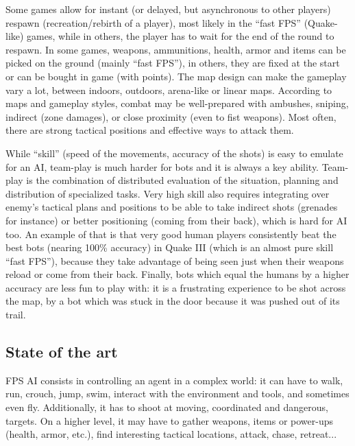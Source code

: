 Some games allow for instant (or delayed, but asynchronous to other players) respawn (recreation/rebirth of a player), most likely in the ``fast FPS'' (Quake-like) games, while in others, the player has to wait for the end of the round to respawn. In some games, weapons, ammunitions, health, armor and items can be picked on the ground (mainly ``fast FPS''), in others, they are fixed at the start or can be bought in game (with points). The map design can make the gameplay vary a lot, between indoors, outdoors, arena-like or linear maps. According to maps and gameplay styles, combat may be well-prepared with ambushes, sniping, indirect (zone damages), or close proximity (even to fist weapons). Most often, there are strong tactical positions and effective ways to attack them. 

While ``skill'' (speed of the movements, accuracy of the shots) is easy to emulate for an AI, team-play is much harder for bots and it is always a key ability. Team-play is the combination of distributed evaluation of the situation, planning and distribution of specialized tasks. Very high skill also requires integrating over enemy's tactical plans and positions to be able to take indirect shots (grenades for instance) or better positioning (coming from their back), which is hard for AI too. An example of that is that very good human players consistently beat the best bots (nearing 100\% accuracy) in Quake III (which is an almost pure skill ``fast FPS''), because they take advantage of being seen just when their weapons reload or come from their back. Finally, bots which equal the humans by a higher accuracy are less fun to play with: it is a frustrating experience to be shot across the map, by a bot which was stuck in the door because it was pushed out of its trail.

\subsection{State of the art}

FPS AI consists in controlling an agent in a complex world: it can have to walk, run, crouch, jump, swim, interact with the environment and tools, and sometimes even fly. Additionally, it has to shoot at moving, coordinated and dangerous, targets. %
On a higher level, it may have to gather weapons, items or power-ups (health, armor, etc.), find interesting tactical locations, attack, chase, retreat...

